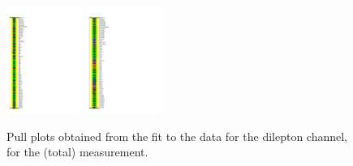 
\begin{figure}[ht]
  \centering
  \includegraphics[width=0.22\textwidth]{figures/diff_xsec/dilep_tty_total_mu_blinded/compare_NP_pulls/compare_NP_dilep_fits_pt_ptj1_ptll/NuisPar_comp.pdf}
  \quad \quad
  \includegraphics[width=0.22\textwidth]{figures/diff_xsec/dilep_tty_total_mu_blinded/compare_NP_pulls/compare_NP_dilep_fits_dr_dr1_dr2/NuisPar_comp.pdf}
  \caption{Pull plots obtained from the fit to the data for the dilepton channel, for the \tty (total) measurement.}
  \label{fig:pull_plot_pt_dilep_mu_blinded_1_tty_total}
\end{figure}
\FloatBarrier

